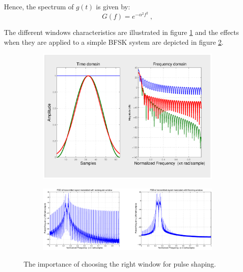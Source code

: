 \documentclass[12pt,a4paper,openright]{report}
\begin{document}
  Hence, the spectrum of $g(t)$ is given by: 
\begin{equation}
G(f) = {e^{ - {\alpha ^2}{f^2}}}\ ,
\end{equation}

The different windows characteristics are illustrated in figure \ref{fig:wc} and the effects when they are applied to a simple BFSK system are depicted in figure \ref{fig:wcomp}.
 \begin{figure}[H]
 \centering
  \label{fig:wincar}
\begin{subfigure}[H]{1\textwidth}
 \centering
    \includegraphics[scale=0.45, trim=0 0 30cm 0, clip=true]{wincomp.eps}
    \label{fig:wc}
\end{subfigure}

\qquad
\qquad

\begin{subfigure}[H]{1\textwidth}
 \centering
    \includegraphics[scale=0.38]{txwinrectVShann.eps}
    \label{fig:wcomp}
    
    \end{subfigure}
    
    \caption[The importance of choosing the right window for pulse shaping]{The importance of choosing the right window for pulse shaping.}
    \label{fig:main}
\end{figure}
\end{document}
